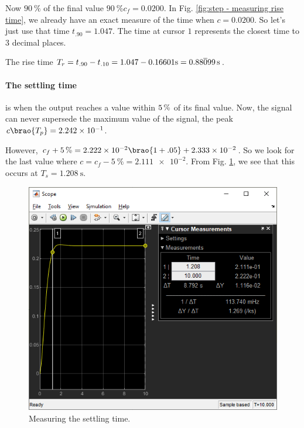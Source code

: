 \documentclass[12pt]{article}
\newcommand*\siexpr[2][]{\SI[parse-numbers=false,#1]{#2}}%
\DeclarePairedDelimiter\brao()%
\begin{document}
Now $\SI{90}\percent$ of the final value $\SI{90}\percent c_f = 0.0200$.
In Fig. \ref{fig:step - measuring rise time}, we already have an exact measure of the time when $c = 0.0200$.
So let's just use that time $t_{.90} = 1.047$.
The time at cursor $1$ represents the closest time to $3$ decimal places.

The rise time $T_r = t_{.90} - t_{.10} = 1.047 - 0.16601 \si\second = \siexpr{0.88\overline099}\second$.

\paragraph{The settling time} is when the output reaches a value within $\SI5\percent$ of its final value.
Now, the signal can never supersede the maximum value of the signal, the peak $c\brao{T_p} = \num{2.242e-1}$.

However, $c_f + \SI{5}\percent = \num{2.222e-2}\brao{1 + .05} + \num{2.333e-2}$.
So we look for the last value where $c = c_f - \SI{5}\percent = \num{2.111e-2}$.
From Fig. \ref{fig:step - measuring setting time}, we see that this occurs at $T_s = \SI{1.208}\second$.

\begin{figure}[h]
    \centering
    \includegraphics[width=\linewidth]{part01a_measuring_settling_time.png}
    \caption{Measuring the settling time.}
    \label{fig:step - measuring setting time}
\end{figure}
\end{document}
